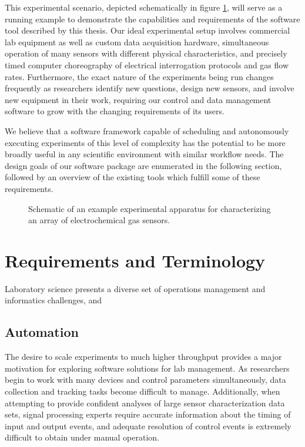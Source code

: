 \documentclass[../thesis]{subfiles}
\begin{document}
This experimental scenario, depicted schematically in figure
\ref{fig:EchemUseCase},
will serve as a running example to demonstrate the
capabilities and requirements of the software tool described by this
thesis. Our ideal experimental setup involves commercial lab equipment
as well as custom data acquisition hardware, simultaneous operation of
many sensors with different physical characteristics, and precisely
timed computer choreography of electrical interrogation protocols and
gas flow rates. Furthermore, the exact nature of the experiments being
run changes frequently as researchers identify new questions, design
new sensors, and involve new equipment in their work,
requiring our control and data management software to grow with the
changing requirements of its users.

We believe that a software framework capable of scheduling and
autonomously executing experiments of this level of complexity has the
potential to be more broadly useful in any scientific environment with
similar workflow needs.
The design goals of our software package are enumerated in the
following section, followed by an overview of the existing tools which
fulfill some of these requirements.

\begin{figure}
  \caption{
    Schematic of an example experimental apparatus for
    characterizing an array of electrochemical gas sensors.
    \label{fig:EchemUseCase}
  }
\end{figure}



\section{Requirements and Terminology}
Laboratory science presents a diverse set of operations management and
informatics challenges, and

\subsection{Automation}
The desire to scale experiments to much higher throughput provides a
major motivation for exploring software solutions for lab management.
As researchers begin to work with many devices and control
parameters simultaneously, data collection and tracking tasks become
difficult to manage. Additionally, when attempting to provide
confident analyses of large sensor characterization data sets, signal
processing experts require accurate information about the timing of
input and output events, and adequate resolution of control events is
extremely difficult to obtain under manual operation.
\end{document}
